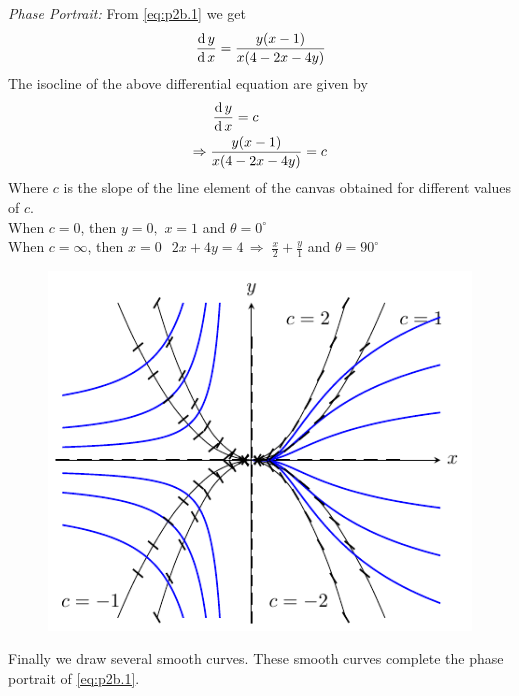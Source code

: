 \documentclass[../main-sheet.tex]{subfiles}
\begin{document}
\begin{soln}[b]
    \emph{Phase Portrait:} From \eqref{eq:p2b.1} we get
    \[\,\frac{\mathrm{d}\,y}{\mathrm{d}\,x}=\frac{y(x-1)}{x(4-2x-4y)}\]
    The isocline of the above differential equation are given by
    \begin{align*}
        &\,\frac{\mathrm{d}\,y}{\mathrm{d}\,x}=c\\
        \Rightarrow\;&\frac{y(x-1)}{x(4-2x-4y)}=c
    \end{align*}
    Where \(c\) is the slope of the line element of the canvas obtained for different values of \(c\).\\
    When \(c=0\), then \(y=0,\,\,x=1\) and \(\theta=0^{\circ}\)\\
    When \(c=\infty\), then \(x=0\;\;\,2x+4y=4\,\Rightarrow\;\frac{x}{2}+\frac{y}{1}\) and \(\theta=90^{\circ}\)
    \begin{figure}[H]
        \centering
        \includegraphics[scale=2]{pr3.pdf}
    \end{figure}
    Finally we draw several smooth curves. These smooth curves complete the phase portrait of \eqref{eq:p2b.1}.
\end{soln}
\end{document}
